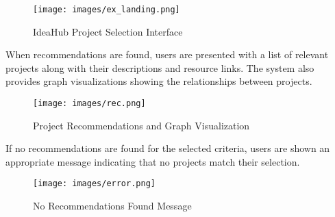 \begin{figure}[H]
\centering
\texttt{[image: images/ex\_landing.png]}
\caption{IdeaHub Project Selection Interface}
\end{figure}

When recommendations are found, users are presented with a list of relevant projects along with their descriptions and resource links. The system also provides graph visualizations showing the relationships between projects.

\begin{figure}[H]
\centering
\texttt{[image: images/rec.png]}
\caption{Project Recommendations and Graph Visualization}
\end{figure}

If no recommendations are found for the selected criteria, users are shown an appropriate message indicating that no projects match their selection.

\begin{figure}[H]
\centering
\texttt{[image: images/error.png]}
\caption{No Recommendations Found Message}
\end{figure}
